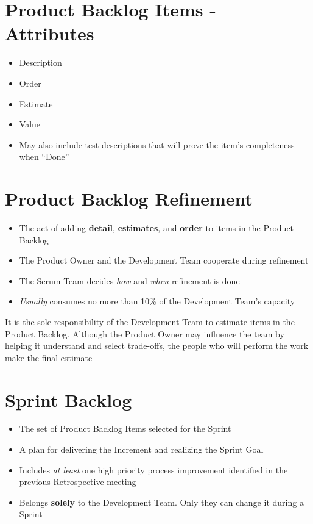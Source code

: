\documentclass[a4paper,11pt,twocolumn]{article}
\begin{document}
\section*{Product Backlog Items - Attributes}
\begin{itemize}
	\item Description
	\item Order
	\item Estimate
	\item Value
	\item May also include test descriptions that will prove the item's completeness when ``Done''
\end{itemize}

\section*{Product Backlog Refinement}
\begin{itemize}
	\item The act of adding \textbf{detail}, \textbf{estimates}, and \textbf{order} to items in the Product Backlog
	\item The Product Owner and the Development Team cooperate during refinement
	\item The Scrum Team decides \textit{how} and \textit{when} refinement is done
	\item \textit{Usually} consumes no more than 10\% of the Development Team's capacity
\end{itemize}

\begin{tcolorbox}[colback=black!8!white,colframe=gray!50!black,title=Note,sharp corners,fonttitle=\normalsize\bfseries,fontupper=\normalsize,left=0.7em,right=0.7em]
	It is the sole responsibility of the Development Team to estimate items in the Product Backlog. Although the Product Owner may influence the team by helping it understand and select trade-offs, the people who will perform the work make the final estimate
\end{tcolorbox}

\section*{Sprint Backlog}
\begin{itemize}
	\item The set of Product Backlog Items selected for the Sprint
	\item A plan for delivering the Increment and realizing the Sprint Goal
	\item Includes \textit{at least} one high priority process improvement identified in the previous Retrospective meeting
	\item Belongs \textbf{solely} to the Development Team. Only they can change it during a Sprint
\end{itemize}
\end{document}
